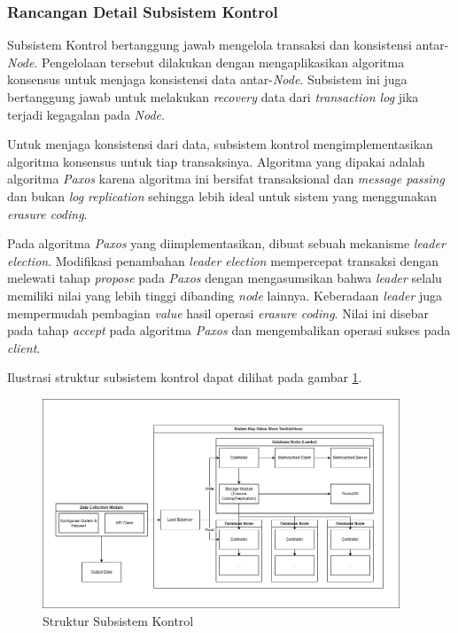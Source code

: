 \subsubsection{Rancangan Detail Subsistem Kontrol}
\label{subsubsection:detail-subsistem-kontrol}
  
Subsistem Kontrol bertanggung jawab mengelola transaksi dan konsistensi antar-\textit{Node}. Pengelolaan tersebut dilakukan dengan mengaplikasikan algoritma konsensus untuk menjaga konsistensi data antar-\textit{Node}. Subsistem ini juga bertanggung jawab untuk melakukan \textit{recovery} data dari \textit{transaction log} jika terjadi kegagalan pada \textit{Node}.

Untuk menjaga konsistensi dari data, subsistem kontrol mengimplementasikan algoritma konsensus untuk tiap transaksinya. Algoritma yang dipakai adalah algoritma \textit{Paxos} karena algoritma ini bersifat transaksional dan \textit{message passing} dan bukan \textit{log replication} sehingga lebih ideal untuk sistem yang menggunakan \textit{erasure coding}.

Pada algoritma \textit{Paxos} yang diimplementasikan, dibuat sebuah mekanisme \textit{leader election}. Modifikasi penambahan \textit{leader election} mempercepat transaksi dengan melewati tahap \textit{propose} pada \textit{Paxos} dengan mengasumsikan bahwa \textit{leader} selalu memiliki nilai yang lebih tinggi dibanding \textit{node} lainnya. Keberadaan \textit{leader} juga mempermudah pembagian \textit{value} hasil operasi \textit{erasure coding}. Nilai ini disebar pada tahap \textit{accept} pada algoritma \textit{Paxos} dan mengembalikan operasi sukses pada \textit{client}.



Ilustrasi struktur subsistem kontrol dapat dilihat pada gambar \ref{fig:control-subsystem-structure}.

\begin{figure}[ht]
    \centering
    \includegraphics[width=0.95\textwidth]{resources/chapter-3/general-architecture.png}
    \caption{Struktur Subsistem Kontrol}
    \label{fig:control-subsystem-structure}
\end{figure}